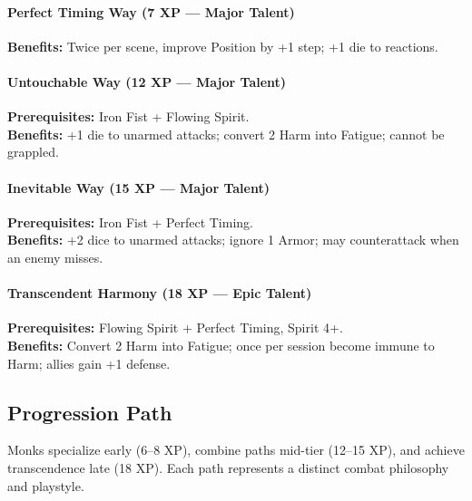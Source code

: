\paragraph{Perfect Timing Way (7 XP --- Major Talent)} 
\textbf{Benefits:} Twice per scene, improve Position by +1 step; +1 die to reactions.

\paragraph{Untouchable Way (12 XP --- Major Talent)} 
\textbf{Prerequisites:} Iron Fist + Flowing Spirit. \\
\textbf{Benefits:} +1 die to unarmed attacks; convert 2 Harm into Fatigue; cannot be grappled.

\paragraph{Inevitable Way (15 XP --- Major Talent)} 
\textbf{Prerequisites:} Iron Fist + Perfect Timing. \\
\textbf{Benefits:} +2 dice to unarmed attacks; ignore 1 Armor; may counterattack when an enemy misses.

\paragraph{Transcendent Harmony (18 XP --- Epic Talent)} 
\textbf{Prerequisites:} Flowing Spirit + Perfect Timing, Spirit 4+. \\
\textbf{Benefits:} Convert 2 Harm into Fatigue; once per session become immune to Harm; allies gain +1 defense.

\subsection*{Progression Path}
Monks specialize early (6--8 XP), combine paths mid-tier (12--15 XP), and achieve transcendence late (18 XP). Each path represents a distinct combat philosophy and playstyle.